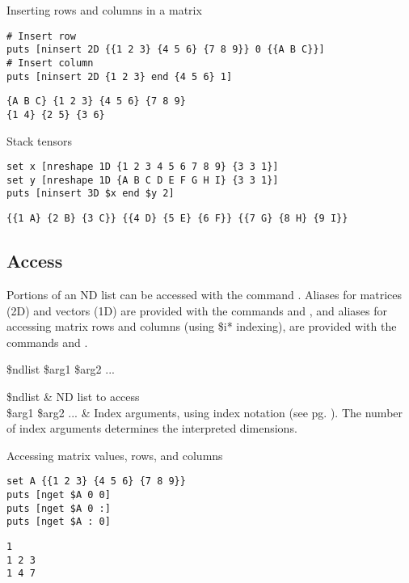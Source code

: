 \documentclass{article}
\begin{document}
\begin{example}{Inserting rows and columns in a matrix}
\begin{lstlisting}
# Insert row
puts [ninsert 2D {{1 2 3} {4 5 6} {7 8 9}} 0 {{A B C}}]
# Insert column
puts [ninsert 2D {1 2 3} end {4 5 6} 1]
\end{lstlisting}
\tcblower
\begin{lstlisting}
{A B C} {1 2 3} {4 5 6} {7 8 9}
{1 4} {2 5} {3 6}
\end{lstlisting}
\end{example}

\begin{example}{Stack tensors}
\begin{lstlisting}
set x [nreshape 1D {1 2 3 4 5 6 7 8 9} {3 3 1}]
set y [nreshape 1D {A B C D E F G H I} {3 3 1}]
puts [ninsert 3D $x end $y 2]
\end{lstlisting}
\tcblower
\begin{lstlisting}
{{1 A} {2 B} {3 C}} {{4 D} {5 E} {6 F}} {{7 G} {8 H} {9 I}}
\end{lstlisting}
\end{example}

\clearpage
\subsection{Access}
Portions of an ND list can be accessed with the command .
Aliases for matrices (2D) and vectors (1D) are provided with the commands  and , and aliases for accessing matrix rows and columns (using \$i* indexing), are provided with the commands  and .
\begin{syntax}
 \$ndlist \$arg1 \$arg2 ...
\end{syntax}
\begin{args}
\$ndlist & ND list to access \\
\$arg1 \$arg2 ... & Index arguments, using index notation (see pg. \pageref{indexformat}). The number of index arguments determines the interpreted dimensions.
\end{args}

\begin{example}{Accessing matrix values, rows, and columns}
\begin{lstlisting}
set A {{1 2 3} {4 5 6} {7 8 9}}
puts [nget $A 0 0]
puts [nget $A 0 :]
puts [nget $A : 0]
\end{lstlisting}
\tcblower
\begin{lstlisting}
1
1 2 3
1 4 7
\end{lstlisting}
\end{example}
\end{document}
